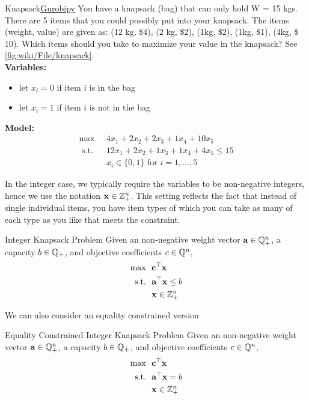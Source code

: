 \begin{examplewithcode}{Knapsack}{\href{https://github.com/open-optimization/open-optimization-or-examples/blob/master/integer-programming/knapsack-problem.ipynb}{Gurobipy}}
\label{example:knapsack}
You have a knapsack (bag) that can only hold W = 15 kgs.  There are 5 items that you could possibly put into your knapsack.  The items (weight, value) are given as:
(12 kg, $\$$4), (2 kg, $\$$2), (1kg, $\$$2), (1kg, $\$$1), (4kg, $\$$10).  Which items should you take to maximize your value in the knapsack? See \autoref{fig:wiki/File/knapsack}.\\

\noindent \textbf{Variables:}
\begin{itemize}
\item let $x_i = 0$ if item $i$ is in the bag
\item let $x_i = 1$ if item $i$ is not in the bag
\end{itemize}
\textbf{Model:}
\begin{align}
\max  \  \ &4 x_1 + 2 x_2 + 2 x_3 + 1 x_4 + 10 x_5 \tag{Total value}\\
\text{ s.t. }\ \ &  12 x_1 + 2 x_2 + 1 x_3 + 1 x_4 + 4 x_5 \leq 15 \tag{Capacity bound}\\
& x_i \in \{0,1\} \text{ for } i=1, \dots, 5 \tag{Item taken or not}
\end{align}
\end{examplewithcode}
In the integer case, we typically require the variables to be non-negative integers, hence we use the notation $\mathbf{x} \in {\mathbb{Z}}^n_+$.  This setting reflects the fact that instead of single individual items, you have item types of which you can take as many of each type as you like that meets the constraint.
\begin{general}{Integer Knapsack Problem}{\npcomplete}
Given an non-negative weight vector $\mathbf{a} \in {\mathbb{Q}}^n_+$, a capacity $b \in {\mathbb{Q}}_+$, and objective coefficients $c \in {\mathbb{Q}}^n$, 
\begin{equation}
\begin{split}
\max \ \ & \mathbf{c}^\top \mathbf{x}\\
\mbox{s.t.}\ \ & \mathbf{a}^\top \mathbf{x} \leq b\\
& \mathbf{x} \in {\mathbb{Z}}^n_+
\end{split}
\end{equation}
\end{general}
We can also consider an equality constrained version
\begin{general}{Equality Constrained Integer Knapsack Problem}{\nphard}
Given an non-negative weight vector $\mathbf{a} \in {\mathbb{Q}}^n_+$, a capacity $b \in {\mathbb{Q}}_+$, and objective coefficients $c \in {\mathbb{Q}}^n$, 
\begin{align}
\max \ \ & \mathbf{c}^\top \mathbf{x}\\
\mbox{s.t.}\ \ & \mathbf{a}^\top \mathbf{x} = b\\
& \mathbf{x} \in {\mathbb{Z}}^n_+
\end{align}
\end{general}



